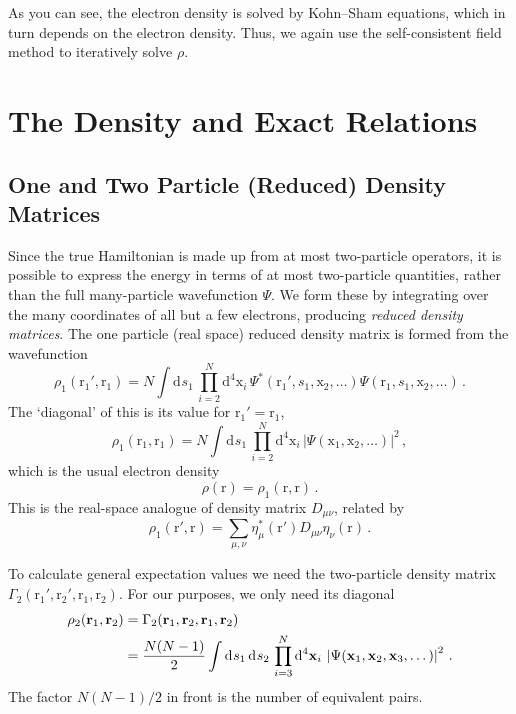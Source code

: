 \documentclass{article}
\theoremstyle{plain}\theoremheaderfont{\normalfont\itshape}\theorembodyfont{\rmfamily}\theoremseparator{.}\newtheorem*{rem}{Remark}\newtheorem*{ex}{Example}\newtheorem*{proof}{Proof}\newtheorem*{altp}{Alternative proof}
\theoremstyle{plain}\theoremheaderfont{\normalfont\bfseries}\theorembodyfont{\rmfamily}\theoremseparator{.}\newtheorem{thm}{Theorem}[section]\newtheorem{lem}[thm]{Lemma}\newtheorem{prop}[thm]{Proposition}\newtheorem*{cor}{Corollary}\newtheorem{defn}[thm]{Definition}\newtheorem{clm}[thm]{Claim}\newtheorem{clminproof}{Claim}
\theoremstyle{break}\theoremheaderfont{\normalfont\itshape}\theorembodyfont{\rmfamily}\theoremseparator{.\medskip}\newtheorem*{proofskip}{Proof}\newtheorem*{exs}{Examples}\newtheorem*{rems}{Remarks}
\theoremstyle{break}\theoremheaderfont{\normalfont\bfseries}\theorembodyfont{\rmfamily}\theoremseparator{.\medskip}\newtheorem{lemskip}[thm]{Lemma}\newtheorem{defnskip}[thm]{Definition}\newtheorem{propskip}[thm]{Proposition}\newtheorem{thmskip}[thm]{Theorem}
\numberwithin{equation}{section}
\newcommand{\dd}[2][]{\mathrm{d}^{#1} #2\,}
\newcommand{\vb}[1]{\bm{\mathrm{#1}}}
\newcommand{\abs}[1]{\left| #1 \right|}
\begin{document}
    As you can see, the electron density is solved by Kohn--Sham equations, which in turn depends on the electron density. Thus, we again use the self-consistent field method to iteratively solve \(\rho\).

    \newpage
    \section{The Density and Exact Relations}
    \subsection{One and Two Particle (Reduced) Density Matrices}
    Since the true Hamiltonian is made up from at most two-particle operators, it is possible to express the energy in terms of at most two-particle quantities, rather than the full many-particle wavefunction \(\Psi\). We form these by integrating over the many coordinates of all but a few electrons, producing \textit{reduced density matrices}. The one particle (real space) reduced density matrix is formed from the wavefunction
    \begin{equation}
        \rho_1(\vb{r}_1',\vb{r}_1)=N\int\dd{s_1}\prod_{i=2}^{N}\dd[4]{\vb{x}_i}\Psi^*(\vb{r}_1',s_1,\vb{x}_2,\dots)\Psi(\vb{r}_1,s_1,\vb{x}_2,\dots)\,.
    \end{equation}
    The `diagonal' of this is its value for \(\vb{r}_1'=\vb{r}_1\),
    \begin{equation}
        \rho_1(\vb{r}_1,\vb{r}_1)=N\int\dd{s_1}\prod_{i=2}^{N}\dd[4]{\vb{x}_i}\abs{\Psi(\vb{x}_1,\vb{x}_2,\dots)}^2\,,
    \end{equation}
    which is the usual electron density
    \begin{equation}
        \rho(\vb{r})=\rho_1(\vb{r},\vb{r})\,.
    \end{equation}
    This is the real-space analogue of density matrix \(D_{\mu\nu}\), related by
    \begin{equation}
        \rho_1(\vb{r}',\vb{r})=\sum_{\mu,\nu}\eta_{\mu}^*(\vb{r}')D_{\mu\nu}\eta_{\nu}(\vb{r})\,.
    \end{equation}

    To calculate general expectation values we need the two-particle density matrix \(\Gamma_2(\vb{r}_1',\vb{r}_2',\vb{r}_1,\vb{r}_2)\). For our purposes, we only need its diagonal
    \begin{align}
        \rho_2(\vb{r}_1,\vb{r}_2)&=\Gamma_2(\vb{r}_1,\vb{r}_2,\vb{r}_1,\vb{r}_2)\notag\\
        &=\frac{N(N-1)}{2}\int\dd{s_1}\dd{s_2}\prod_{i=3}^{N}\dd[4]{\vb{x}_i}\abs{\Psi(\vb{x}_1,\vb{x}_2,\vb{x}_3,\dots)}^2\,.
    \end{align}
    The factor \(N(N-1)/2\) in front is the number of equivalent pairs.
\end{document}
